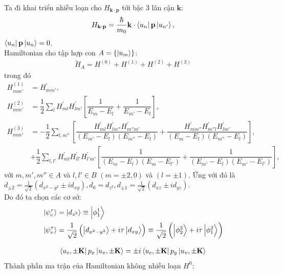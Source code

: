 \documentclass{report}
\newcommand{\f}[2]{\dfrac{#1}{#2}}
\begin{document}
Ta đi khai triển nhiễu loạn cho $H_{\mathbf{k\cdot p}}$ tới bậc 3 lân cận $\mathbf{k}$:
\begin{align}
	H_{\mathbf{k\cdot p}} = \f{\hbar}{m_0} \mathbf{k}\cdot \bra{u_{n}}\mathbf{p}\ket{u_{n'}},
\end{align}
$\bra{u_{n}}\mathbf{p}\ket{u_{n}} =0$. \\
Hamiltonian cho tập hợp con $A = \{ \ket{u_m}\}$:
\begin{align}
	\breve{H}_A = H^{(0)} + H^{(1)} + H^{(2)} + H^{(3)}
\end{align}
trong đó
\begin{align*}
	H^{(1)}_{mm'} & = H^{'}_{mm'},                                                                                                                                                                                              \\
	H^{(2)}_{mm'} & = \f{1}{2} \sum_l H^{'}_{ml} H^{'}_{lm'} \left[ \f{1}{E_m - E_l} + \f{1}{E_{m'} - E_l} \right],                                                                                                             \\
	H^{(3)}_{mm'} & = -\f{1}{2} \sum_{l,m''} \left[ \f{ H^{'}_{ml}H^{'}_{lm''}H^{'}_{m'' m'} }{ (E_{m'} - E_{l})(E_{m''} - E_{l})} +  \f{ H^{'}_{mm''}H^{'}_{m''l}H^{'}_{l m'} }{ (E_{m} - E_{l})(E_{m''} - E_{l})  } \right] , \\
	              & + \f{1}{2} \sum_{l,l'}^{} H^{'}_{ml}H^{'}_{ll'}H^{'}_{l'm'}\left[ \f{1}{ (E_{m} - E_{l})(E_{m} - E_{l'})} + \f{1}{ (E_{m'} - E_{l})(E_{m'} - E_{l'})} \right],
\end{align*}
với $m,m',m'' \in A$ và $l,l' \in B$ $(m = \pm 2,0)$ và $(l = \pm 1)$. Ứng với đó là $d_{\pm 2} = \frac{1}{\sqrt{2}}(d_{x^2-y^2} \pm i d_{xy}), d_0 = d_{z^2}, d_{\pm 1} = \frac{1}{\sqrt{2}}(d_{xz} \pm i d_{yz})$.\\
Do đó ta chọn các cơ sở:
\begin{align*}
	 & \ket{\psi_{c}^{\tau}} = \ket{d_{z^2}} \equiv \ket{\phi^1_1}                                                                                                                      \\
	 & \ket{\mathcal{\psi}_{v}^{\tau}} = \f{1}{\sqrt{2}} \left(\ket{d_{x^2-y^2}} + i\tau \ket{d_{xy}}\right)  \equiv \f{1}{\sqrt{2}} \left(\ket{\phi^2_2} + i\tau \ket{\phi^2_1}\right)
\end{align*}

\begin{align}
	\bra{u_c,\pm \mathbf{K}} p_x \ket{u_v,\pm \mathbf{K}} = \pm i \bra{u_c,\pm \mathbf{K}} p_y \ket{u_v,\pm \mathbf{K}}
\end{align}
Thành phần ma trận của Hamiltonian không nhiễu loạn $H^0$:
\end{document}
